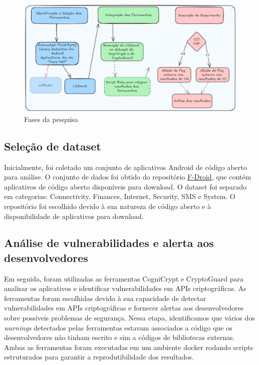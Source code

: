 \FloatBarrier

\begin{figure}[!ht]
  \centering
  \includegraphics[scale=0.4]{img/research_steps2.png}
  \caption{Fases da pesquisa}
  \label{img: research_steps2}
\end{figure}

\FloatBarrier

\subsection{Seleção de dataset} 

Inicialmente, foi coletado um conjunto de aplicativos Android de código aberto para análise. O conjunto de dados foi obtido do repositório \href{https://f-droid.org/pt_BR/packages/}{F-Droid}, que contém aplicativos de código aberto disponíveis para download. O dataset foi separado em categorias: Connectivity, Finances, Internet, Security, SMS e System. O repositório foi escolhido devido à sua natureza de código aberto e à disponibilidade de aplicativos para download. 

\subsection{Análise de vulnerabilidades e alerta aos desenvolvedores} 

Em seguida, foram utilizadas as ferramentas CogniCrypt e CryptoGuard para analisar os aplicativos e identificar vulnerabilidades em APIs criptográficas. As ferramentas foram escolhidas devido à sua capacidade de detectar vulnerabilidades em APIs criptográficas e fornecer alertas aos desenvolvedores sobre possíveis problemas de segurança. Nessa etapa, identificamos que vários dos \textit{warnings} detectados pelas ferramentas estavam associados a código que os desenvolvedores não tinham escrito e sim a códigos de bibliotecas externas. Ambas as ferramentas foram executadas em um ambiente docker rodando scripts estruturados para garantir a reprodutibilidade dos resultados. 


